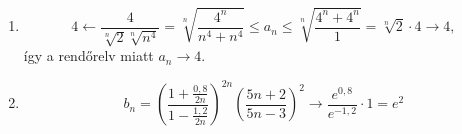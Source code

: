 \documentclass[11pt]{scrartcl}
\begin{document}
\begin{enumerate}
	\item \[
		      4
		      \leftarrow \frac{4}{\sqrt[n]{2} \sqrt[n]{n^4}}
		      = \sqrt[n]{\frac{4^n}{n^4 + n^4}}
		      \le a_n
		      \le \sqrt[n]{\frac{4^n + 4^n}{1}}
		      = \sqrt[n]{2} \cdot 4 \to 4,
	      \]
	      így a rendőrelv miatt $a_n \to 4$.

	\item \[
		      b_n
		      = \left( \frac{1 + \frac{0{,}8}{2n}}{1 - \frac{1{,}2}{2n}} \right)^{2n}
		      \left( \frac{5n + 2}{5n - 3} \right)^2
		      \to \frac{e^{0{,}8}}{e^{-1{,}2}} \cdot 1
		      = e^2
	      \]
\end{enumerate}
\end{document}
